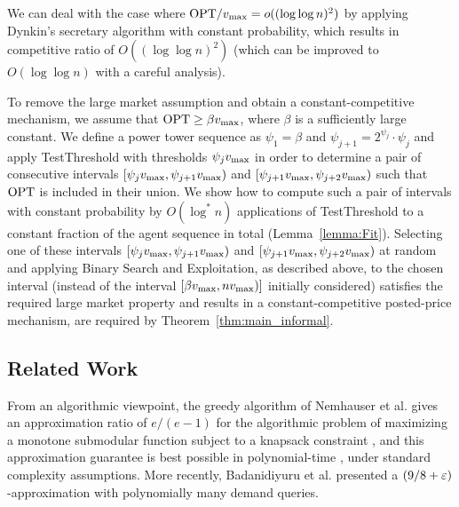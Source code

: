 We can deal with the case where $\mathrm{OPT} / v_{\text{max}} = o((\log\log n)^2)$ by applying Dynkin's secretary algorithm \cite{Dynkin63} with constant probability, which results in competitive ratio of $O((\log\log n)^2)$ (which can be improved to $O(\log\log n)$ with a careful analysis). 

To remove the large market assumption and obtain a constant-competitive mechanism, we assume that $\mathrm{OPT} \geq \beta v_{\text{max}}$, where $\beta$ is a sufficiently large constant. We define a power tower sequence as $\psi_1 = \beta$ and $\psi_{j+1} = 2^{\psi_j}\cdot \psi_j$ and apply TestThreshold with thresholds $\psi_j v_{\text{max}}$ in order to determine a pair of consecutive intervals $[\psi_j v_{\text{max}}, \psi_{j+1} v_{\text{max}})$ and $[\psi_{j+1} v_{\text{max}}, \psi_{j+2}v_{\text{max}})$ such that $\mathrm{OPT}$ is included in their union. We show how to compute such a pair of intervals with constant probability by $O(\log^\ast n)$ applications of TestThreshold to a constant fraction of the agent sequence in total (Lemma~\ref{lemma:Fit}). 
%
Selecting one of these intervals $[\psi_j v_{\text{max}}, \psi_{j+1} v_{\text{max}})$ and $[\psi_{j+1} v_{\text{max}}, \psi_{j+2}v_{\text{max}})$ at random and applying Binary Search and Exploitation, as described above, to the chosen interval (instead of the interval $[\beta v_{\text{max}}, n v_{\text{max}})]$ initially considered) satisfies the required large market property and results in a constant-competitive posted-price mechanism, are required by %
Theorem~\ref{thm:main_informal}. 

\subsection{Related Work}
\label{sec:related}

From an algorithmic viewpoint, the greedy algorithm of Nemhauser et al. \cite{NemhauserWF78} gives an approximation ratio of $e/(e-1)$ for the algorithmic problem of maximizing a monotone submodular function subject to a knapsack constraint \cite{Sviri04}, and this approximation guarantee is best possible in polynomial-time  \cite{KhullerMN99}, under standard complexity assumptions. More recently, Badanidiyuru et al. \cite{BadaDO19} presented a $(9/8+\varepsilon)$-approximation with  polynomially many demand queries.

